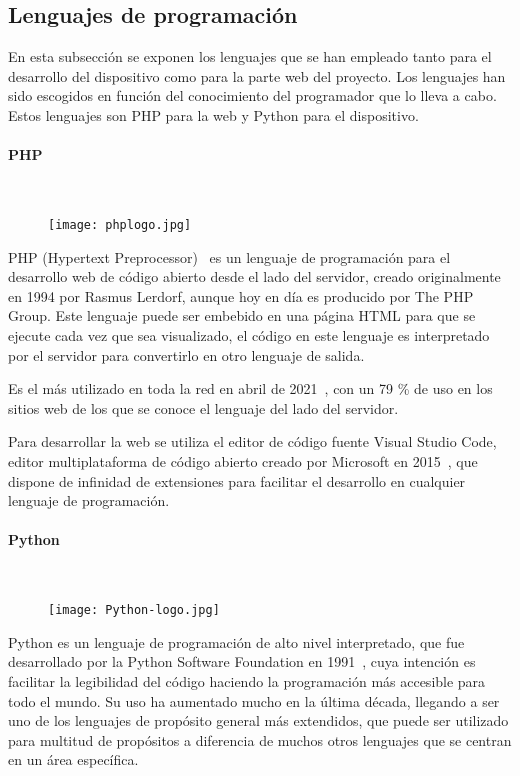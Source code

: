 \subsection{Lenguajes de programación}\label{subsec:lenguajes}
En esta subsección se exponen los lenguajes que se han empleado tanto para el desarrollo del dispositivo como para la parte web del proyecto. Los lenguajes han sido escogidos en función del conocimiento del programador que lo lleva a cabo. Estos lenguajes son PHP para la web y Python para el dispositivo.

\paragraph{PHP}\mbox{} \\
\begin{figure}[H]
	{\texttt{[image: phplogo.jpg]}}\label{fig:phpLogo}
\end{figure}
PHP (Hypertext Preprocessor)~\cite{welling_php_2003} es un lenguaje de programación para el desarrollo web de código abierto desde el lado del servidor, creado originalmente en 1994 por Rasmus Lerdorf, aunque hoy en día es producido por The PHP Group. Este lenguaje puede ser embebido en una página HTML para que se ejecute cada vez que sea visualizado, el código en este lenguaje es interpretado por el servidor para convertirlo en otro lenguaje de salida.

Es el más utilizado en toda la red en abril de 2021~\cite{q-success_usage_nodate}, con un 79 \% de uso en los sitios web de los que se conoce el lenguaje del lado del servidor.

Para desarrollar la web se utiliza el editor de código fuente Visual Studio Code, editor multiplataforma de código abierto creado por Microsoft en 2015~\cite{noauthor_visual_2021}, que dispone de infinidad de extensiones para facilitar el desarrollo en cualquier lenguaje de programación.

\paragraph{Python}\mbox{} \\
\begin{figure}[H]
	{\texttt{[image: Python-logo.jpg]}}\label{fig:logoPython}
\end{figure}
Python es un lenguaje de programación de alto nivel interpretado, que fue desarrollado por la Python Software Foundation en 1991~\cite{montoro_python_2012}, cuya intención es facilitar la legibilidad del código haciendo la programación más accesible para todo el mundo. Su uso ha aumentado mucho en la última década, llegando a ser uno de los lenguajes de propósito general más extendidos, que puede ser utilizado para multitud de propósitos a diferencia de muchos otros lenguajes que se centran en un área específica.

